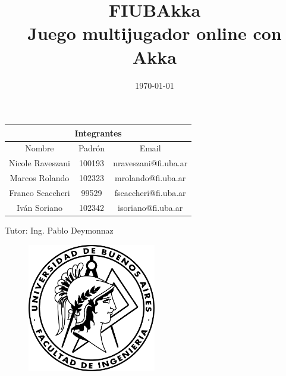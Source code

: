 \documentclass[11pt]{article}
\begin{document}
\title{\textbf{FIUBAkka} \\ \large \textbf{Juego multijugador online con Akka}}

\date{\today}

\maketitle %

\begin{table}[h!]
  \centering
  \begin{tabular}{|c|c|c|}
      \hline
      \multicolumn{3}{|c|}{\textbf{Integrantes}} \\
      \hline\hline
      Nombre & Padrón & Email \\
      \hline\hline
      Nicole Raveszani & 100193 & nraveszani@fi.uba.ar \\
      \hline
      Marcos Rolando & 102323 & mrolando@fi.uba.ar \\
      \hline
      Franco Scaccheri & 99529 & fscaccheri@fi.uba.ar \\
      \hline
      Iván Soriano & 102342 & isoriano@fi.uba.ar \\
      \hline
  \end{tabular}
\end{table}

\begin{center}
  Tutor: Ing. Pablo Deymonnaz
\end{center}

\thispagestyle{empty}

\begin{figure}[htbp]
    \centering
    \includegraphics[width=0.5\textwidth]{../assets/fiuba-logo.png}
\end{figure}

\newpage
\thispagestyle{empty}
\tableofcontents
\thispagestyle{empty}
\newpage
\end{document}
